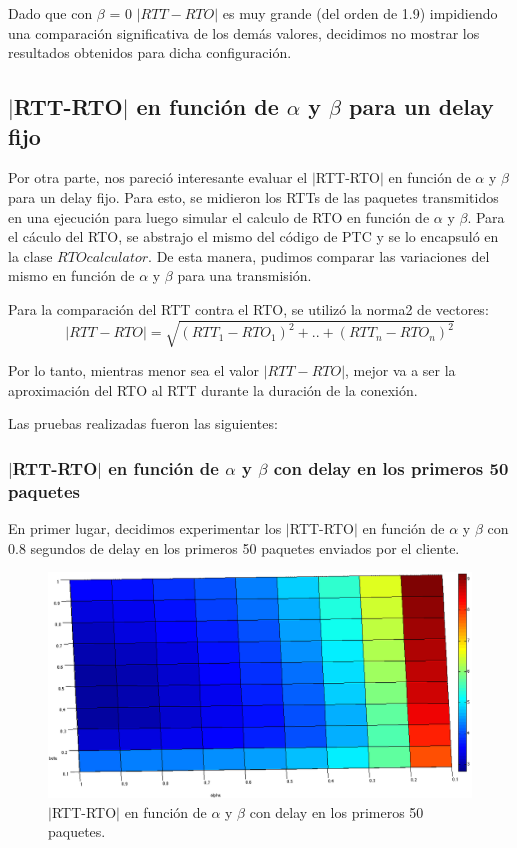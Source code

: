 \documentclass[10pt, a4paper]{article}
\begin{document}
Dado que con $\beta$ = 0 $|RTT-RTO|$ es muy grande (del orden de 1.9) impidiendo una comparación significativa de los demás valores, decidimos no mostrar los resultados obtenidos para dicha configuración.

\newpage
\subsection{$|$RTT-RTO$|$ en función de $\alpha$ y $\beta$ para un delay fijo}

Por otra parte, nos pareció interesante evaluar el $|$RTT-RTO$|$ en función de $\alpha$ y $\beta$ para un delay fijo. Para esto, se midieron los RTTs de las paquetes transmitidos en una ejecución para luego simular el calculo de RTO en función de $\alpha$ y $\beta$.
Para el cáculo del RTO, se abstrajo el mismo del código de PTC y se lo encapsuló en la clase $RTOcalculator$. De esta manera, pudimos comparar las variaciones del mismo en función de $\alpha$ y $\beta$ para una transmisión.

Para la comparación del RTT contra el RTO, se utilizó la norma2 de vectores:
$$ |RTT-RTO| = \sqrt{(RTT_1-RTO_1)^2+..+(RTT_n-RTO_n)^2} $$

Por lo tanto, mientras menor sea el valor $|RTT-RTO|$, mejor va a ser la aproximación del RTO al RTT durante la duración de la conexión. 

Las pruebas realizadas fueron las siguientes:

\subsubsection{$|$RTT-RTO$|$ en función de $\alpha$ y $\beta$ con delay en los primeros 50 paquetes}
En primer lugar, decidimos experimentar los $|$RTT-RTO$|$ en función de $\alpha$ y $\beta$ con 0.8 segundos de delay en los primeros 50 paquetes enviados por el cliente.

\begin{figure}[H]
\begin{center}
\includegraphics[width=17cm]{delay-50F.png}
\caption{$|$RTT-RTO$|$ en función de $\alpha$ y $\beta$ con delay en los primeros 50 paquetes.}
\end{center}
\end{figure}
\end{document}
